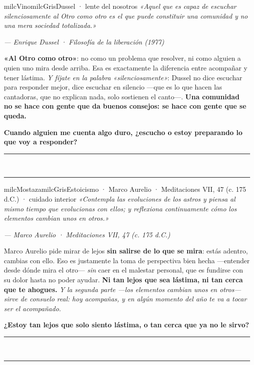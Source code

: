 \documentclass[11pt,letterpaper]{article}
\newcommand{\linead}[1]{\noindent\color{milcLinea}\rule{#1}{0.5pt}\color{milcNegro}}
\begin{document}
\begin{softbox}{milcVino}{milcGris}{Dussel · lente del nosotros}
\textit{«Aquel que es capaz de escuchar silenciosamente al Otro como otro es el que puede constituir una comunidad y no una mera sociedad totalizada.»}

{\footnotesize\itshape\color{milcNegro!70}--- Enrique Dussel · Filosofía de la liberación (1977)}

\textbf{«Al Otro como otro»}: no como un problema que resolver, ni como alguien a quien uno mira desde arriba. Esa es exactamente la diferencia entre acompañar y tener lástima. \emph{Y fíjate en la palabra «silenciosamente»}: Dussel no dice escuchar para responder mejor, dice escuchar en silencio ---que es lo que hacen las cantadoras, que no explican nada, solo sostienen el canto---. \textbf{Una comunidad no se hace con gente que da buenos consejos: se hace con gente que se queda.}

\textbf{Cuando alguien me cuenta algo duro, ¿escucho o estoy preparando lo que voy a responder?}
\end{softbox}
\linead{\linewidth}\\[1mm]
\linead{\linewidth}

\begin{softbox}{milcMostaza}{milcGris}{Estoicismo · Marco Aurelio · Meditaciones VII, 47 (c. 175 d.C.) · cuidado interior}
\textit{«Contempla las evoluciones de los astros y piensa al mismo tiempo que evolucionas con ellos; y reflexiona continuamente cómo los elementos cambian unos en otros.»}

{\footnotesize\itshape\color{milcNegro!70}--- Marco Aurelio · Meditaciones VII, 47 (c. 175 d.C.)}

Marco Aurelio pide mirar de lejos \textbf{sin salirse de lo que se mira}: estás adentro, cambias con ello. Eso es justamente la toma de perspectiva bien hecha ---entender desde dónde mira el otro--- \emph{sin} caer en el malestar personal, que es fundirse con su dolor hasta no poder ayudar. \textbf{Ni tan lejos que sea lástima, ni tan cerca que te ahogues.} \emph{Y la segunda parte ---los elementos cambian unos en otros--- sirve de consuelo real: hoy acompañas, y en algún momento del año te va a tocar ser el acompañado.}

\textbf{¿Estoy tan lejos que solo siento lástima, o tan cerca que ya no le sirvo?}
\end{softbox}
\linead{\linewidth}\\[1mm]
\linead{\linewidth}
\end{document}
